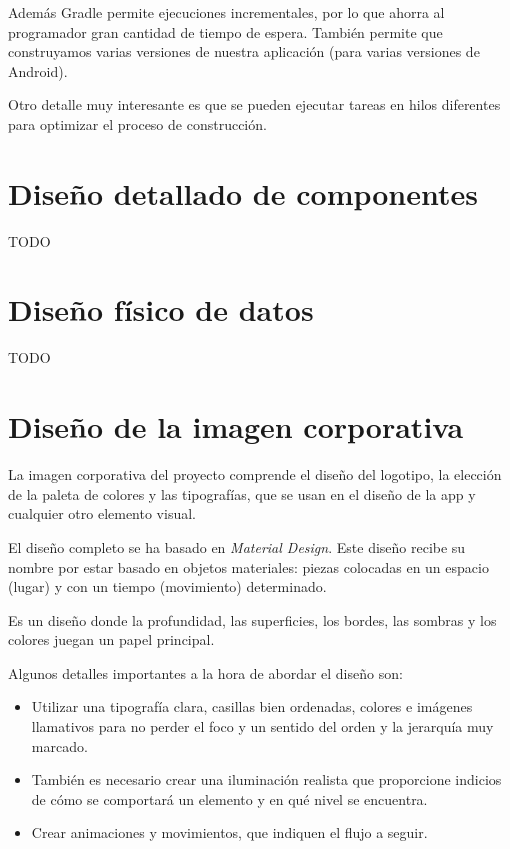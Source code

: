 Además Gradle permite ejecuciones incrementales, por lo que ahorra al
programador gran cantidad de tiempo de espera. También permite que construyamos
varias versiones de nuestra aplicación (para varias versiones de Android).

Otro detalle muy interesante es que se pueden ejecutar tareas en hilos
diferentes para optimizar el proceso de construcción.


\section{Diseño detallado de componentes}

TODO


\section{Diseño físico de datos}

TODO


\section{Diseño de la imagen corporativa}

La imagen corporativa del proyecto comprende el diseño del logotipo, la elección
de la paleta de colores y las tipografías, que se usan en el diseño de la app y
cualquier otro elemento visual.

El diseño completo se ha basado en
\textit{Material Design}.\cite{material-design} Este diseño recibe su nombre por
estar basado en objetos materiales: piezas colocadas en un espacio (lugar) y con
un tiempo (movimiento) determinado.

Es un diseño donde la profundidad, las superficies, los bordes, las sombras y
los colores juegan un papel principal.

Algunos detalles importantes a la hora de abordar el diseño son:
\begin{itemize}
\item Utilizar una tipografía clara, casillas bien ordenadas, colores e
  imágenes llamativos para no perder el foco y un sentido del orden y la
  jerarquía muy marcado.
\item También es necesario crear una iluminación realista que proporcione
  indicios de cómo se comportará un elemento y en qué nivel se encuentra.
\item Crear animaciones y movimientos, que indiquen el flujo a seguir.
\end{itemize}


